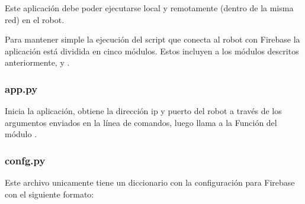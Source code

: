 Este aplicación debe poder ejecutarse local y remotamente (dentro de la misma red)
en el robot.

Para mantener simple la ejecución del script que conecta al robot con Firebase
la aplicación está dividida en cinco módulos. Estos incluyen a los módulos
descritos anteriormente,  y .


\subsubsection{app.py}
\label{\detokenize{nao_firebase:app-py}}\label{\detokenize{nao_firebase:module-app}}

\begin{fulllineitems}
\label{\detokenize{nao_firebase:app.main}}
Inicia la aplicación, obtiene la dirección ip y puerto del robot a través
de los argumentos enviados en la línea de comandos, luego llama a la Función
 del módulo .

\end{fulllineitems}



\subsubsection{confg.py}
\label{\detokenize{nao_firebase:confg-py}}
Este archivo unicamente tiene un diccionario con la configuración para Firebase
con el siguiente formato:

%
\begin{sphinxVerbatim}[commandchars=\\\{\}]
  
     
     
     
\end{sphinxVerbatim}


